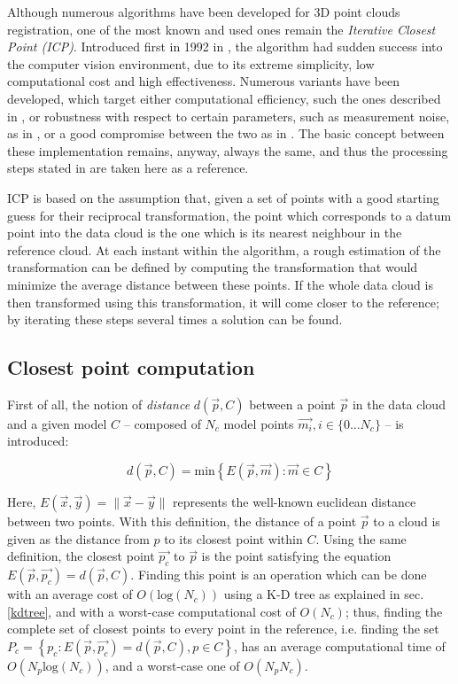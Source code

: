 Although numerous algorithms have been developed for 3D point clouds
registration, one of the most known and used ones remain the
\emph{Iterative Closest Point (\emph{ICP})}. Introduced first in 1992 in
\cite{icp}, the algorithm had sudden success into the computer vision
environment, due to its extreme simplicity, low computational cost and high
effectiveness. Numerous variants have been developed, which target either
computational efficiency, such the ones described in
\cite{icp-fast-algorithms}, or robustness with respect to certain parameters,
such as measurement noise, as in \cite{icp-bayes}, or a good compromise between the
two as in \cite{icp-robust}. The basic concept between these implementation
remains, anyway, always the same, and thus the processing steps stated in
\cite{icp} are taken here as a reference.

ICP is based on the assumption that, given a set of points with a good starting
guess for their reciprocal transformation, the point which corresponds to a
datum point into the data cloud is the one which is its
nearest neighbour in the reference cloud. At each instant within the
algorithm, a rough estimation of the transformation can be defined by computing
the transformation that would minimize the average distance between these
points. If the whole data cloud is then transformed using this transformation,
it will come closer to the reference; by iterating these steps several times a
solution can be found.

\subsection{Closest point computation}
First of all, the notion of \emph{distance} $d(\vec{p},C)$ between a point $\vec{p}$ in the data cloud
and a given model $C$ -- composed of $N_c$ model points $\vec{m_i}, i \in \{0 \dots
N_c\}$  -- is introduced:

\begin{equation}
  d(\vec{p},C) = \text{min}\left\{ E(\vec{p}, \vec{m}) : \vec{m} \in C \right\}
\end{equation}

Here, $E(\vec{x},\vec{y})=\lVert \vec{x} - \vec{y} \rVert$ represents the well-known
euclidean distance between two points. With this definition, the distance of a
point $\vec{p}$ to a cloud is given as the distance from $p$ to its closest
point within $C$. Using the same definition, the closest point $\vec{p_c}$ to
$\vec{p}$ is the point satisfying the equation $E(\vec{p},
\vec{p_c})=d(\vec{p}, C)$. Finding this point is an operation which can be done
with an average cost of $O\left(\text{log}\left(N_c\right)\right)$ using a K-D
tree as explained in sec. \ref{kdtree}, and with a worst-case computational cost of
$O\left( N_c \right)$; thus, finding the complete set of closest points to
every point in the reference, i.e. finding the set $P_{c} = \left\{ p_c :
E(\vec{p},\vec{p_c}) = d(\vec{p},C) , p \in C \right\}$, has an average
computational time of $O\left( N_p \text{log}\left(N_c\right) \right)$, and a
worst-case one of $O\left( N_p N_c \right)$.

